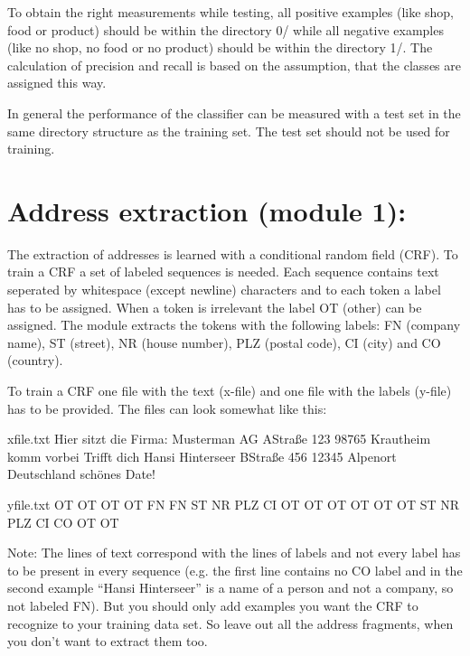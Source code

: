 \documentclass[letterpaper,10pt,english]{sphinxmanual}
\begin{document}
To obtain the right measurements while testing, all positive examples
(like shop, food or product) should be within the directory 0/ while
all negative examples (like no shop, no food or no product) should be
within the directory 1/. The calculation of precision and recall is
based on the assumption, that the classes are assigned this way.

In general the performance of the classifier can be measured with a
test set in the same directory structure as the training set. The test
set should not be used for training.


\section{Address extraction (module 1):}
\label{\detokenize{training:address-extraction-module-1}}
The extraction of addresses is learned with a conditional random field
(CRF). To train a CRF a set of labeled sequences is needed. Each
sequence contains text seperated by whitespace (except newline)
characters and to each token a label has to be assigned. When a token
is irrelevant the label OT (other) can be assigned. The module
extracts the tokens with the following labels: FN (company name), ST
(street), NR (house number), PLZ (postal code), CI (city) and CO
(country).

To train a CRF one file with the text (x-file) and one file with the
labels (y-file) has to be provided. The files can look somewhat like
this:

%
\begin{sphinxVerbatim}[commandchars=\\\{\}]
x\PYGZhy{}file.txt
  Hier sitzt die Firma: Musterman AG A\PYGZhy{}Straße 123 98765 Krautheim komm vorbei
  Trifft dich Hansi Hinterseer B\PYGZhy{}Straße 456 12345 Alpenort Deutschland schönes Date!

y\PYGZhy{}file.txt
  OT OT OT OT FN FN ST NR PLZ CI OT OT
  OT OT OT OT ST NR PLZ CI CO OT OT
\end{sphinxVerbatim}

Note: The lines of text correspond with the lines of labels and not
every label has to be present in every sequence (e.g. the first line
contains no CO label and in the second example “Hansi Hinterseer” is a
name of a person and not a company, so not labeled FN). But you should
only add examples you want the CRF to recognize to your training data
set. So leave out all the address fragments, when you don’t want to
extract them too.
\end{document}
